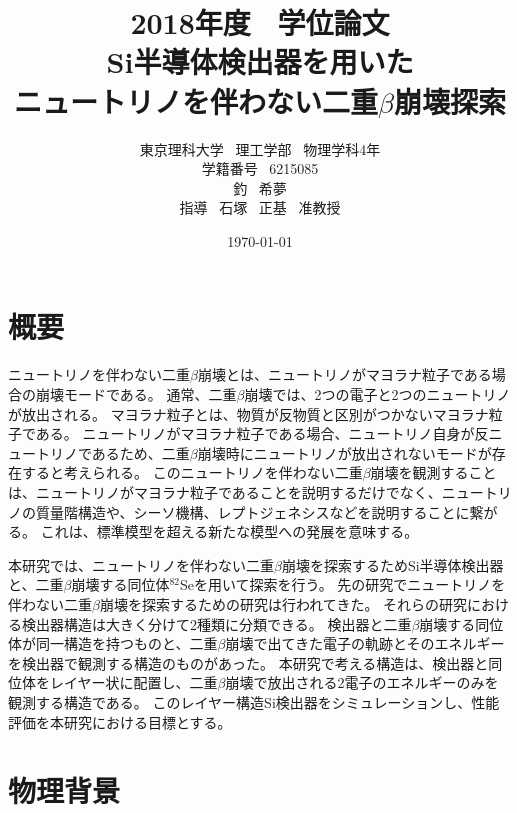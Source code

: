\documentclass[a4paper,10pt]{jreport}
\title{
2018年度 \ 学位論文 \\
\vspace{20mm}
\huge Si半導体検出器を用いた \\
\huge ニュートリノを伴わない二重$\beta$崩壊探索
\vspace{50mm}
}
\author{
東京理科大学 \ 理工学部 \ 物理学科4年 \\
学籍番号 \ 6215085 \vspace{5mm} \\
\LARGE 釣 \ 希夢 \vspace{5mm} \\
指導 \ 石塚 \ 正基 \ 准教授 \vspace{5mm}
}
\date{\today}
\begin{document}
\maketitle

\chapter*{概要}

ニュートリノを伴わない二重$\beta$崩壊とは、ニュートリノがマヨラナ粒子である場合の崩壊モードである。
通常、二重$\beta$崩壊では、2つの電子と2つのニュートリノが放出される。
マヨラナ粒子とは、物質が反物質と区別がつかないマヨラナ粒子である。
ニュートリノがマヨラナ粒子である場合、ニュートリノ自身が反ニュートリノであるため、二重$\beta$崩壊時にニュートリノが放出されないモードが存在すると考えられる。
このニュートリノを伴わない二重$\beta$崩壊を観測することは、ニュートリノがマヨラナ粒子であることを説明するだけでなく、ニュートリノの質量階構造や、シーソ機構、レプトジェネシスなどを説明することに繋がる。
これは、標準模型を超える新たな模型への発展を意味する。

本研究では、ニュートリノを伴わない二重$\beta$崩壊を探索するためSi半導体検出器と、二重$\beta$崩壊する同位体$^{82}$Seを用いて探索を行う。
先の研究でニュートリノを伴わない二重$\beta$崩壊を探索するための研究は行われてきた。
それらの研究における検出器構造は大きく分けて2種類に分類できる。
検出器と二重$\beta$崩壊する同位体が同一構造を持つものと、二重$\beta$崩壊で出てきた電子の軌跡とそのエネルギーを検出器で観測する構造のものがあった。
本研究で考える構造は、検出器と同位体をレイヤー状に配置し、二重$\beta$崩壊で放出される2電子のエネルギーのみを観測する構造である。
このレイヤー構造Si検出器をシミュレーションし、性能評価を本研究における目標とする。

\clearpage



\tableofcontents
\thispagestyle{empty}
\clearpage



\listoftables
\thispagestyle{empty}
\clearpage



\listoffigures
\thispagestyle{empty}
\clearpage




\chapter{物理背景}
\end{document}
